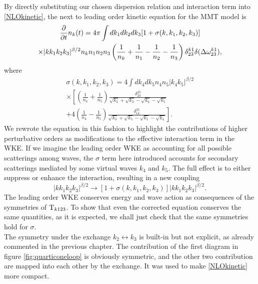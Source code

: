     By directly substituting our chosen dispersion relation and interaction term into \eqref{NLOkinetic}, the next to leading order kinetic equation for the MMT 
    model is 
    \begin{multline}
        \frac{\partial}{\partial t}n_k(t) = 4\pi \int dk_1dk_2dk_3[1 + \sigma(k,k_1,k_2,k_3)]\\
        \times |kk_1k_2k_3|^{\beta/2} n_kn_1n_2n_3 \left(\frac{1}{n_k} +\frac{1}{n_1}-
        \frac{1}{n_2}-\frac{1}{n_3}\right)\delta_{23}^{k1}\delta(\Delta{\omega}^{k1}_{23}), 
        \label{wke_nlo}
    \end{multline}
    where 
    \begin{multline}
        \sigma(k,k_1,k_2,k_3) =  4 \int dk_4dk_5n_4n_5|k_4k_5|^{\beta/2} \\
        \times \left[\left( \frac{1}{n_4}+\frac{1}{n_5} \right) 
        \frac{\delta_{23}^{45}}{\sqrt{k_2}+\sqrt{k_3}-\sqrt{k_4}-\sqrt{k_5}} \right.
        \\ + 4\left( \frac{1}{n_4}-\frac{1}{n_5} \right) 
        \left.\frac{\delta_{14}^{35}}{\sqrt{k_3}+\sqrt{k_5}-\sqrt{k_1}-\sqrt{k_4}}\right].
        \label{sigma}
    \end{multline}
    We rewrote the equation in this fashion to highlight the contributions of higher perturbative orders as modifications to the effective interaction term in the WKE.
    If we imagine the leading order WKE as accounting for all possible scatterings among waves, the $\sigma$ term here introduced accounts for secondary scatterings 
    mediated by some virtual waves $k_4$ and $k_5$. The full effect is to either suppress or enhance the interaction, resulting in a new coupling 
    \begin{equation*}
    |kk_1k_2k_3|^{\beta/2} \longrightarrow [1 + \sigma(k,k_1,k_2,k_3)]|kk_1k_2k_3|^{\beta/2} . 
    \end{equation*}
    The leading order WKE conserves energy and wave action as consequences of the symmetries of $\mathrm{T}_{k123}$. To show that even the corrected equation 
    conserves the same quantities, as it is expected, we shall just check that the same symmetries hold for $\sigma$.\\
    The symmetry under the exchange $k_2 \leftrightarrow k_3$ is built-in but not explicit, as already commented in the previous chapter. The contribution of the 
    first diagram in figure \ref{fig:quarticoneloop} is obviously symmetric, and the other two contribution are mapped into each other by the exchange. It was used to make
    \eqref{NLOkinetic} more compact. \\

